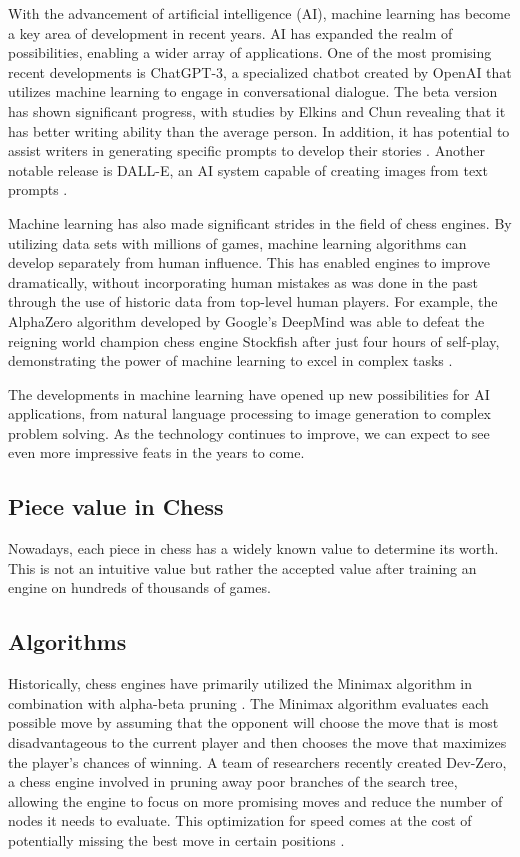 \begin{spacing}{2.0}
With the advancement of artificial intelligence (AI), machine learning has become a key area of development in recent years. AI has expanded the realm of possibilities, enabling a wider array of applications. One of the most promising recent developments is ChatGPT-3, a specialized chatbot created by OpenAI that utilizes machine learning to engage in conversational dialogue. The beta version has shown significant progress, with studies by Elkins and Chun revealing that it has better writing ability than the average person. In addition, it has potential to assist writers in generating specific prompts to develop their stories \cite{gpt-3, gpt-3_turing}. Another notable release is DALL-E, an AI system capable of creating images from text prompts \cite{dall-e}.

Machine learning has also made significant strides in the field of chess engines. By utilizing data sets with millions of games, machine learning algorithms can develop separately from human influence. This has enabled engines to improve dramatically, without incorporating human mistakes as was done in the past through the use of historic data from top-level human players. For example, the AlphaZero algorithm developed by Google's DeepMind was able to defeat the reigning world champion chess engine Stockfish after just four hours of self-play, demonstrating the power of machine learning to excel in complex tasks \cite{MasteringChessShogi}.

The developments in machine learning have opened up new possibilities for AI applications, from natural language processing to image generation to complex problem solving. As the technology continues to improve, we can expect to see even more impressive feats in the years to come.

\subsection{Piece value in Chess}

Nowadays, each piece in chess has a widely known value to determine its worth. This is not an intuitive value but rather the accepted value after training an engine on hundreds of thousands of games.

\subsection{Algorithms}

Historically, chess engines have primarily utilized the Minimax algorithm in combination with alpha-beta pruning \cite{MasteringChessShogi}. The Minimax algorithm evaluates each possible move by assuming that the opponent will choose the move that is most disadvantageous to the current player and then chooses the move that maximizes the player's chances of winning. A team of researchers recently created Dev-Zero, a chess engine involved in pruning away poor branches of the search tree, allowing the engine to focus on more promising moves and reduce the number of nodes it needs to evaluate. This optimization for speed comes at the cost of potentially missing the best move in certain positions \cite{Dev-Zero}. 


\end{spacing}

